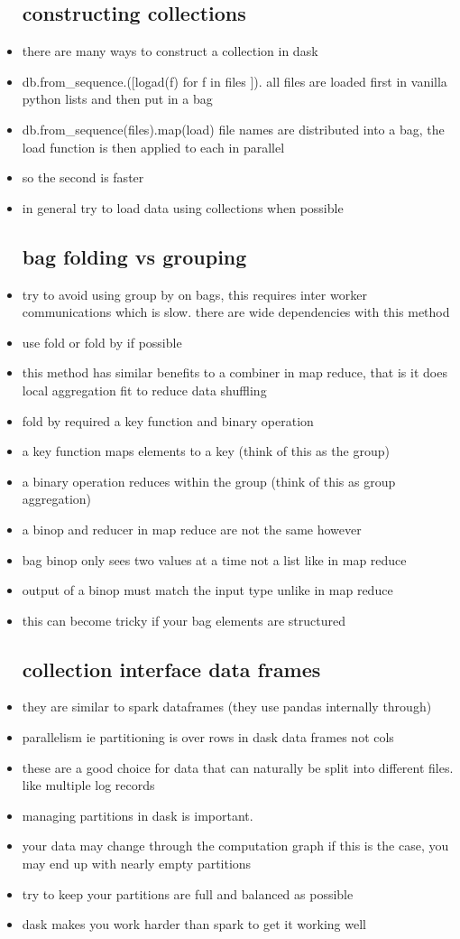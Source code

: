 \documentclass{article}
\begin{document}
\begin{itemize}
\subsection*{constructing collections}
\item there are many ways to construct a collection in dask 
\item db.from\_sequence.([logad(f) for f in files ]). all files are loaded first in vanilla python lists and then put in a bag 
\item db.from\_sequence(files).map(load) file names are distributed into a bag, the load function is then applied to each in parallel
\item so the second is faster 
\item in general try to load data using collections when possible 
\subsection*{bag folding vs grouping }
\item try to avoid using group by on bags, this requires inter worker communications which is slow. there are wide dependencies with this method 
\item use fold or fold by if possible
\item this method has similar benefits to a combiner in map reduce, that is it does local aggregation fit to reduce data shuffling 
\item fold by required a key function and binary operation 
\item a key function maps elements to a key (think of this as the group)
\item a binary operation reduces within the group (think of this as group aggregation)
\item a binop and reducer in map reduce are not the same however 
\item bag binop only sees two values at a time not a list like in map reduce 
\item output of a binop must match the input type unlike in map reduce 
\item this can become tricky if your bag elements are structured
\subsection*{collection interface data frames}
\item they are similar to spark dataframes (they use pandas internally through)
\item parallelism ie partitioning is over rows in dask data frames not cols 
\item these are a good choice for data that can naturally be split into different files. like multiple log records
\item managing partitions in dask is important. 
\item your data may change through the computation graph if this is the case, you may end up with nearly empty partitions
\item try to keep your partitions are full and balanced as possible
\item dask makes you work harder than spark to get it working well

\end{itemize}
\end{document}
